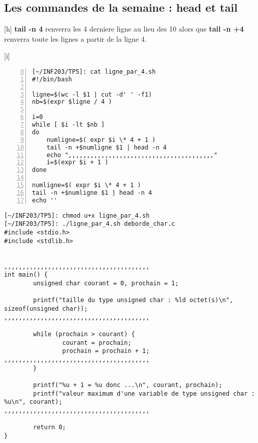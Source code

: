 \documentclass[12pt,a4paper,notitlepage,colorinlistoftodos]{article}
\begin{document}
\subsection{Les commandes de la semaine : head et tail}

[h]
\textbf{tail -n 4} renverra les 4 derniere ligne au lieu des 10 alors que
\textbf{tail -n +4} renverra toute les lignes a partir de la ligne 4.

[i]
\begin{lstlisting}[numbers=left, firstnumber = 0 ]
[~/INF203/TP5]: cat ligne_par_4.sh
#!/bin/bash

ligne=$(wc -l $1 | cut -d' ' -f1)
nb=$(expr $ligne / 4 )

i=0
while [ $i -lt $nb ]
do
    numligne=$( expr $i \* 4 + 1 )
    tail -n +$numligne $1 | head -n 4
    echo ",,,,,,,,,,,,,,,,,,,,,,,,,,,,,,,,,,,,,,,,"
    i=$(expr $i + 1 )
done

numligne=$( expr $i \* 4 + 1 )
tail -n +$numligne $1 | head -n 4
echo ''
\end{lstlisting}

\newpage
\begin{lstlisting}
[~/INF203/TP5]: chmod u+x ligne_par_4.sh
[~/INF203/TP5]: ./ligne_par_4.sh deborde_char.c
#include <stdio.h>
#include <stdlib.h>


,,,,,,,,,,,,,,,,,,,,,,,,,,,,,,,,,,,,,,,,
int main() {
        unsigned char courant = 0, prochain = 1;

        printf("taille du type unsigned char : %ld octet(s)\n", sizeof(unsigned char));
,,,,,,,,,,,,,,,,,,,,,,,,,,,,,,,,,,,,,,,,

        while (prochain > courant) {
                courant = prochain;
                prochain = prochain + 1;
,,,,,,,,,,,,,,,,,,,,,,,,,,,,,,,,,,,,,,,,
        }

        printf("%u + 1 = %u donc ...\n", courant, prochain);
        printf("valeur maximum d'une variable de type unsigned char : %u\n", courant);
,,,,,,,,,,,,,,,,,,,,,,,,,,,,,,,,,,,,,,,,

        return 0;
}
\end{lstlisting}


\cite{}


\end{document}
